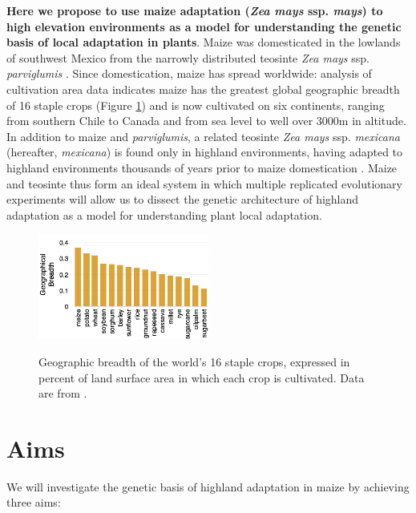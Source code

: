 {\bf Here we propose to use maize adaptation (\emph{Zea mays} ssp. \emph{mays}) to high elevation environments as a model for understanding the genetic basis of local adaptation in plants}.  Maize was domesticated in the lowlands of southwest Mexico from the narrowly distributed teosinte \emph{Zea mays} ssp. \emph{parviglumis} \citep[hereafter, \emph{parviglumis};][]{Matsuoka2002}. Since domestication, maize has spread worldwide: analysis of cultivation area data  indicates maize has the greatest global geographic breadth of 16 staple crops (Figure \ref{fig:breadth}) and is now cultivated on six continents, ranging from southern Chile to Canada \citep{tenaillon2011european} and from sea level to well over 3000m in altitude. In addition to maize and \emph{parviglumis}, a related  teosinte \emph{Zea mays} ssp. \emph{mexicana} (hereafter, \emph{mexicana}) is found only in highland environments, having adapted to highland environments thousands of years prior to maize domestication \citep{Ross-Ibarra2009a, hufford2012inferences}. Maize and teosinte thus form an ideal system in which multiple replicated evolutionary experiments will allow us to dissect the genetic architecture of highland adaptation as a model for understanding plant local adaptation.

\begin{figure}
  \centering
  \caption{Geographic breadth of the world's 16 staple crops, expressed in percent of land surface area in which each crop is cultivated. Data are from \citet{monfreda2008farming}. } 
   \includegraphics[width=0.5\textwidth]{breadth.png}
\label{fig:breadth}
\end{figure}

\section*{Aims}

We will investigate the genetic basis of highland adaptation in maize by achieving three aims:

